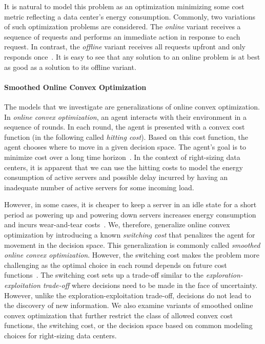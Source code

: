It is natural to model this problem as an optimization minimizing some cost metric reflecting a data center's energy consumption. Commonly, two variations of such optimization problems are considered. The \emph{online} variant receives a sequence of requests and performs an immediate action in response to each request. In contrast, the \emph{offline} variant receives all requests upfront and only responds once~\cite{Karp1992}. It is easy to see that any solution to an online problem is at best as good as a solution to its offline variant.

\paragraph{Smoothed Online Convex Optimization} The models that we investigate are generalizations of online convex optimization. In \emph{online convex optimization}, an agent interacts with their environment in a sequence of rounds. In each round, the agent is presented with a convex cost function (in the following called \emph{hitting cost}). Based on this cost function, the agent chooses where to move in a given decision space. The agent's goal is to minimize cost over a long time horizon~\cite{Hazan2019}. In the context of right-sizing data centers, it is apparent that we can use the hitting costs to model the energy consumption of active servers and possible delay incurred by having an inadequate number of active servers for some incoming load.

However, in some cases, it is cheaper to keep a server in an idle state for a short period as powering up and powering down servers increases energy consumption and incurs wear-and-tear costs~\cite{Lin2011}. We, therefore, generalize online convex optimization by introducing a known \emph{switching cost} that penalizes the agent for movement in the decision space. This generalization is commonly called \emph{smoothed online convex optimization}. However, the switching cost makes the problem more challenging as the optimal choice in each round depends on future cost functions~\cite{Chen2015}. The switching cost sets up a trade-off similar to the \emph{exploration-exploitation trade-off} where decisions need to be made in the face of uncertainty. However, unlike the exploration-exploitation trade-off, decisions do not lead to the discovery of new information. We also examine variants of smoothed online convex optimization that further restrict the class of allowed convex cost functions, the switching cost, or the decision space based on common modeling choices for right-sizing data centers.

